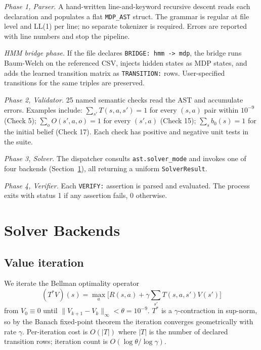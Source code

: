 \documentclass[conference]{IEEEtran}
\begin{document}
\emph{Phase 1, Parser.} A hand-written line-and-keyword recursive
descent reads each declaration and populates a flat
\texttt{MDP\_AST} struct. The grammar is regular at file level and
LL(1) per line; no separate tokenizer is required. Errors are
reported with line numbers and stop the pipeline.

\emph{HMM bridge phase.} If the file declares \texttt{BRIDGE: hmm
-> mdp}, the bridge runs Baum-Welch on the referenced CSV, injects
hidden states as MDP states, and adds the learned transition matrix
as \texttt{TRANSITION:} rows. User-specified transitions for the
same triples are preserved.

\emph{Phase 2, Validator.} 25 named semantic checks read the AST
and accumulate errors. Examples include: $\sum_{s'} T(s, a, s') = 1$
for every $(s, a)$ pair within $10^{-9}$ (Check 5);
$\sum_o O(s', a, o) = 1$ for every $(s', a)$ (Check 15);
$\sum_s b_0(s) = 1$ for the initial belief (Check 17). Each check
has positive and negative unit tests in the suite.

\emph{Phase 3, Solver.} The dispatcher consults
\texttt{ast.solver\_mode} and invokes one of four backends
(Section~\ref{sec:solvers}), all returning a uniform
\texttt{SolverResult}.

\emph{Phase 4, Verifier.} Each \texttt{VERIFY:} assertion is parsed
and evaluated. The process exits with status 1 if any assertion
fails, 0 otherwise.

\section{Solver Backends}\label{sec:solvers}

\subsection{Value iteration}

We iterate the Bellman optimality operator
\begin{equation}
(T^* V)(s) = \max_a \Big[ R(s,a) + \gamma \sum_{s'} T(s,a,s') V(s') \Big]
\label{eq:bellman-opt}
\end{equation}
from $V_0 \equiv 0$ until $\|V_{k+1} - V_k\|_\infty < \theta = 10^{-9}$.
$T^*$ is a $\gamma$-contraction in sup-norm, so by the Banach
fixed-point theorem the iteration converges geometrically with rate
$\gamma$. Per-iteration cost is $O(|T|)$ where $|T|$ is the number
of declared transition rows; iteration count is
$O(\log\theta / \log\gamma)$.
\end{document}
